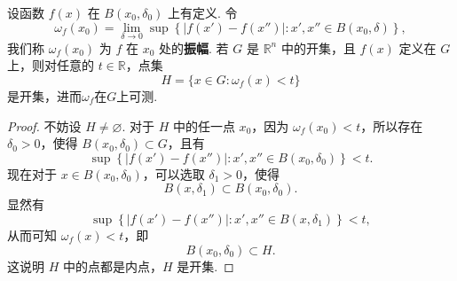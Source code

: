 \documentclass[../../main.tex]{subfiles}
\begin{document}
\begin{proposition}[振幅函数及其性质]\label{proposition:振幅函数可测}
设函数 \( f(x) \) 在 \( B(x_0, \delta_0) \) 上有定义. 令
\[
\omega_f(x_0) = \lim_{\delta \to 0} \sup \left\{ |f(x') - f(x'')| : x', x'' \in B(x_0, \delta) \right\},
\]
我们称 \( \omega_f(x_0) \) 为 \( f \) 在 \( x_0 \) 处的\textbf{振幅}. 若 \( G \) 是 \( \mathbb{R}^n \) 中的开集，且 \( f(x) \) 定义在 \( G \) 上，则对任意的 \( t \in \mathbb{R} \)，点集
\[
H = \{ x \in G : \omega_f(x) < t \}
\]
是开集，进而$\omega_f$在$G$上可测.
\end{proposition}
\begin{proof}
不妨设 \( H \neq \varnothing \). 对于 \( H \) 中的任一点 \( x_0 \)，因为 \( \omega_f(x_0) < t \)，所以存在 \( \delta_0 > 0 \)，使得 \( B(x_0, \delta_0) \subset G \)，且有
\[
\sup \left\{ |f(x') - f(x'')| : x', x'' \in B(x_0, \delta_0) \right\} < t.
\]
现在对于 \( x \in B(x_0, \delta_0) \)，可以选取 \( \delta_1 > 0 \)，使得
\[
B(x, \delta_1) \subset B(x_0, \delta_0).
\]
显然有
\[
\sup \left\{ |f(x') - f(x'')| : x', x'' \in B(x, \delta_1) \right\} < t,
\]
从而可知 \( \omega_f(x) < t \)，即
\[
B(x_0, \delta_0) \subset H.
\]
这说明 \( H \) 中的点都是内点，\( H \) 是开集.

\end{proof}
\end{document}
